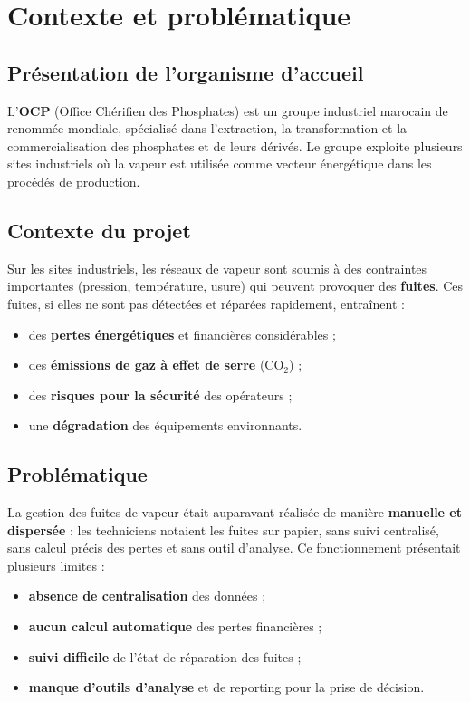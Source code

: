 \documentclass[12pt,a4paper,oneside]{report}
\begin{document}
\chapter{Contexte et problématique}

\section{Présentation de l'organisme d'accueil}

L'\textbf{OCP} (Office Chérifien des Phosphates) est un groupe industriel marocain de renommée mondiale, spécialisé dans l'extraction, la transformation et la commercialisation des phosphates et de leurs dérivés. Le groupe exploite plusieurs sites industriels où la vapeur est utilisée comme vecteur énergétique dans les procédés de production.

\section{Contexte du projet}

Sur les sites industriels, les réseaux de vapeur sont soumis à des contraintes importantes (pression, température, usure) qui peuvent provoquer des \textbf{fuites}. Ces fuites, si elles ne sont pas détectées et réparées rapidement, entraînent :
\begin{itemize}
    \item des \textbf{pertes énergétiques} et financières considérables ;
    \item des \textbf{émissions de gaz à effet de serre} (CO$_2$) ;
    \item des \textbf{risques pour la sécurité} des opérateurs ;
    \item une \textbf{dégradation} des équipements environnants.
\end{itemize}

\section{Problématique}

La gestion des fuites de vapeur était auparavant réalisée de manière \textbf{manuelle et dispersée} : les techniciens notaient les fuites sur papier, sans suivi centralisé, sans calcul précis des pertes et sans outil d'analyse. Ce fonctionnement présentait plusieurs limites :
\begin{itemize}
    \item \textbf{absence de centralisation} des données ;
    \item \textbf{aucun calcul automatique} des pertes financières ;
    \item \textbf{suivi difficile} de l'état de réparation des fuites ;
    \item \textbf{manque d'outils d'analyse} et de reporting pour la prise de décision.
\end{itemize}
\end{document}
